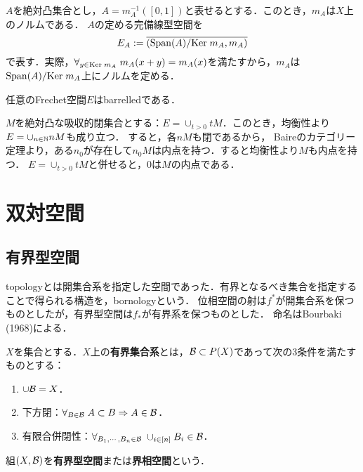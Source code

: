 \documentclass[uplatex,dvipdfmx]{jsreport}
\begin{document}
\begin{notation}
    $A$を絶対凸集合とし，$A=m_A^{-1}([0,1])$と表せるとする．このとき，$m_A$は$X$上のノルムである．
    $A$の定める完備線型空間を
    \[E_A:=\overline{\left(\mathrm{Span}(A)/\mathrm{Ker}\; m_A,m_A\right)}\]
    で表す．実際，$\forall_{y\in\mathrm{Ker}\; m_A}\;m_A(x+y)=m_A(x)$を満たすから，$m_A$は$\mathrm{Span}(A)/\mathrm{Ker}\; m_A$上にノルムを定める．
\end{notation}

\begin{proposition}
    任意のFrechet空間$E$はbarrelledである．
\end{proposition}
\begin{Proof}
    $M$を絶対凸な吸収的閉集合とする：$E=\cup_{t>0}tM$．このとき，均衡性より$E=\cup_{n\in\mathbb{N}}nM$も成り立つ．
    すると，各$nM$も閉であるから，
    Baireのカテゴリー定理より，ある$n_0$が存在して$n_0M$は内点を持つ．すると均衡性より$M$も内点を持つ．
    $E=\cup_{t>0}tM$と併せると，$0$は$M$の内点である．
\end{Proof}

\section{双対空間}

\subsection{有界型空間}

\begin{tcolorbox}[colframe=ForestGreen, colback=ForestGreen!10!white,breakable,colbacktitle=ForestGreen!40!white,coltitle=black,fonttitle=\bfseries\sffamily,
title=]
    topologyとは開集合系を指定した空間であった．有界となるべき集合を指定することで得られる構造を，bornologyという．
    位相空間の射は$f^*$が開集合系を保つものとしたが，有界型空間は$f_*$が有界系を保つものとした．
    命名はBourbaki (1968)による．
\end{tcolorbox}

\begin{definition}
    $X$を集合とする．$X$上の\textbf{有界集合系}とは，$\mathcal{B}\subset P(X)$であって次の3条件を満たすものとする：
    \begin{enumerate}
        \item $\cup\mathcal{B}=X$．
        \item 下方閉：$\forall_{B\in\mathcal{B}}\;A\subset B\Rightarrow A\in\mathcal{B}$．
        \item 有限合併閉性：$\forall_{B_1,\cdots,B_n\in\mathcal{B}}\;\cup_{i\in[n]}B_i\in\mathcal{B}$．
    \end{enumerate}
    組$(X,\mathcal{B})$を\textbf{有界型空間}または\textbf{界相空間}という．
\end{definition}
\end{document}
